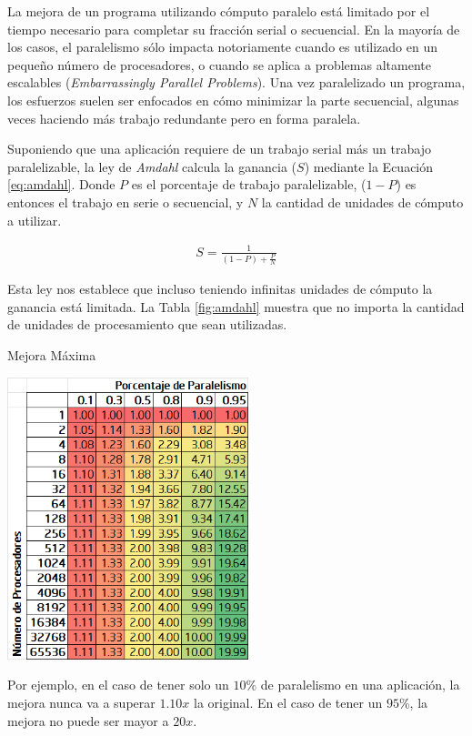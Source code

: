 \documentclass[a4paper]{report}
\begin{document}
La mejora de un programa utilizando cómputo paralelo está limitado por el tiempo necesario para completar su fracción serial o secuencial. En la mayoría de los casos, el paralelismo sólo impacta notoriamente cuando es utilizado en un pequeño número de procesadores, o cuando se aplica a problemas altamente escalables ({\it Embarrassingly Parallel Problems}). Una vez paralelizado un programa, los esfuerzos suelen ser enfocados en cómo minimizar la parte secuencial, algunas veces haciendo más trabajo redundante pero en forma paralela.

\bigskip

Suponiendo que una aplicación requiere de un trabajo serial más un trabajo paralelizable, la ley de {\it Amdahl} calcula la ganancia ($ S $) mediante la Ecuación \ref{eq:amdahl}.
Donde $ P $ es el porcentaje de trabajo paralelizable, ($ 1-P $) es entonces el trabajo en serie o secuencial, y $ N $ la cantidad de unidades de cómputo a utilizar.

\begin{eqnarray}
\label{eq:amdahl}
S = \frac{1}{(1 - P) + \frac{P}{N}}
\end{eqnarray}

Esta ley nos establece que incluso teniendo infinitas unidades de cómputo la ganancia está limitada.
La Tabla \ref{fig:amdahl} muestra que no importa la cantidad de unidades de
procesamiento que sean utilizadas.

\begin{table}[H]
\caption{Mejora Máxima}
\centering
\includegraphics[width=7cm]{amdahl.png}

\label{fig:amdahl}
\end{table}

Por ejemplo, en el caso de tener solo un $ 10\% $ de paralelismo
en una aplicación, la mejora nunca va a superar $ 1.10x $ la original.
En el caso de tener un $ 95\% $, la mejora no puede ser mayor a $ 20x $.
\end{document}
